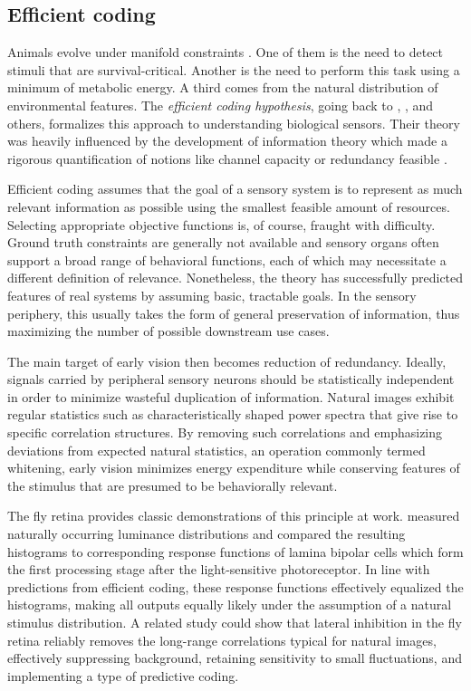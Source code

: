 \subsection{Efficient coding} Animals evolve under manifold constraints \citep{Simoncelli:2001dn}. One of them is the need to detect stimuli that are survival-critical. Another is the need to perform this task using a minimum of metabolic energy. A third comes from the natural distribution of environmental features. The \textit{efficient coding hypothesis}, going back to \citet{Attneave:1954aa}, \citet{Barlow:1961aa}, and others, formalizes this approach to understanding biological sensors. Their theory was heavily influenced by the development of information theory which made a rigorous quantification of notions like channel capacity or redundancy feasible \citep{Cover:2006aa,Borst:1999hw}.

Efficient coding assumes that the goal of a sensory system is to represent as much relevant information as possible using the smallest feasible amount of resources. Selecting appropriate objective functions is, of course, fraught with difficulty. Ground truth constraints are generally not available and sensory organs often support a broad range of behavioral functions, each of which may necessitate a different definition of relevance. Nonetheless, the theory has successfully predicted features of real systems by assuming basic, tractable goals. In the sensory periphery, this usually takes the form of general preservation of information, thus maximizing the number of possible downstream use cases.

The main target of early vision then becomes reduction of redundancy. Ideally, signals carried by peripheral sensory neurons should be statistically independent in order to minimize wasteful duplication of information. Natural images exhibit regular statistics such as characteristically shaped power spectra that give rise to specific correlation structures. By removing such correlations and emphasizing deviations from expected natural statistics, an operation commonly termed whitening, early vision minimizes energy expenditure while conserving features of the stimulus that are presumed to be behaviorally relevant.

The fly retina provides classic demonstrations of this principle at work. \citet{Laughlin:1981wn} measured naturally occurring luminance distributions and compared the resulting histograms to corresponding response functions of lamina bipolar cells which form the first processing stage after the light-sensitive photoreceptor. In line with predictions from efficient coding, these response functions effectively equalized the histograms, making all outputs equally likely under the assumption of a natural stimulus distribution. A related study \citep{Srinivasan:1982uq} could show that lateral inhibition in the fly retina reliably removes the long-range correlations typical for natural images, effectively suppressing background, retaining sensitivity to small fluctuations, and implementing a type of predictive coding.

